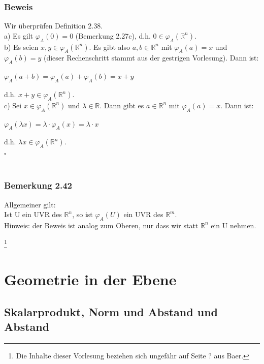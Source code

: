 \documentclass{article}
\begin{document}
\subsubsection*{Beweis}
Wir überprüfen Definition 2.38. \\
a) Es gilt $\varphi_A(0) = 0$ (Bemerkung 2.27c), d.h. $0 \in \varphi_A(\mathbb{R}^n)$. \\
b) Es seien $x,y \in \varphi_A(\mathbb{R}^n)$. Es gibt also $a,b \in \mathbb{R}^n$ mit $\varphi_A(a)=x$ und $\varphi_A(b)=y$ (dieser Rechenschritt stammt aus der gestrigen Vorlesung). Dann ist: \\
\begin{center}
    $\varphi_A(a+b) = \varphi_A(a) + \varphi_A(b) = x+y$ \\
\end{center}
d.h. $x+y \in \varphi_A(\mathbb{R}^n)$. \\
c) Sei $x \in \varphi_A(\mathbb{R}^n)$ und $\lambda \in \mathbb{R}$. Dann gibt es $a \in \mathbb{R}^n$ mit $\varphi_A(a)=x$. Dann ist: \\
\begin{center}
    $\varphi_A(\lambda x) = \lambda \cdot \varphi_A(x) = \lambda \cdot x$ \\
\end{center}
d.h. $\lambda x \in \varphi_A(\mathbb{R}^n)$. \\
$\square$ \\
\\
\subsubsection*{Bemerkung 2.42}
Allgemeiner gilt: \\
Ist U ein UVR des $\mathbb{R}^n$, so ist $\varphi_A(U)$ ein UVR des $\mathbb{R}^m$. \\
Hinweis: der Beweis ist analog zum Oberen, nur dass wir statt $\mathbb{R}^n$ ein U nehmen. \\

\newpage
\date{Mittwoch, 29.11.23} \footnote[1]{Die Inhalte dieser Vorlesung beziehen sich ungefähr auf Seite ? aus Baer.}

\section{Geometrie in der Ebene}
\subsection{Skalarprodukt, Norm und Abstand und Abstand}
\end{document}
